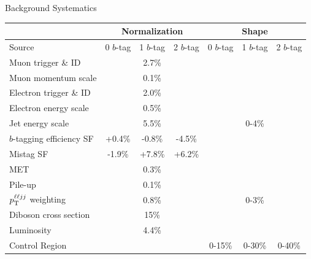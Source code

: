 \begin{frame}{Background Systematics}
\begin{center}
\footnotesize
\begin{tabular}{|l|c|c|c|c|c|c|}
\hline
                           &   \multicolumn{3}{c|}{Normalization}   &   \multicolumn{3}{c|}{Shape}  \\ \hline
Source &   0 $b$-tag   &   1 $b$-tag  &   2 $b$-tag &   0 $b$-tag   &   1 $b$-tag  &   2 $b$-tag \\ \hline \hline
Muon trigger \& ID               &  \multicolumn{3}{c|}{2.7\%}            &    \multicolumn{3}{c|}{}      \\
Muon momentum scale              &  \multicolumn{3}{c|}{0.1\%}            &    \multicolumn{3}{c|}{}      \\
Electron trigger \& ID           &  \multicolumn{3}{c|}{2.0\%}            &    \multicolumn{3}{c|}{}      \\
Electron energy scale            &  \multicolumn{3}{c|}{0.5\%}            &     \multicolumn{3}{c|}{}     \\
Jet energy scale                 &  \multicolumn{3}{c|}{5.5\%}            &  \multicolumn{3}{c|}{0-4\%}  \\ 
\hline
$b$-tagging efficiency SF        & +0.4\% & -0.8\%  & -4.5\% &           \multicolumn{3}{c|}{} \\
Mistag SF                        & -1.9\% & +7.8\% & +6.2\%             &      \multicolumn{3}{c|}{}    \\ 
\hline
MET                              &  \multicolumn{3}{c|}{0.3\%}            &     \multicolumn{3}{c|}{}     \\ 
Pile-up                          &  \multicolumn{3}{c|}{0.1\%}            &     \multicolumn{3}{c|}{}     \\
$p_{\mathrm{T}}^{\ell\ell jj}$ weighting       &  \multicolumn{3}{c|}{0.8\%}            &   \multicolumn{3}{c|}{0-3\%}  \\
Diboson cross section            &  \multicolumn{3}{c|}{15\%}             &     \multicolumn{3}{c|}{}     \\
Luminosity                       &  \multicolumn{3}{c|}{4.4\%}           &      \multicolumn{3}{c|}{}    \\ \hline 
Control Region                   &    \multicolumn{3}{c|}{}               &  0-15\% &  0-30\% &  0-40\%  \\
\hline 
\end{tabular} 
\end{center}
\end{frame}



